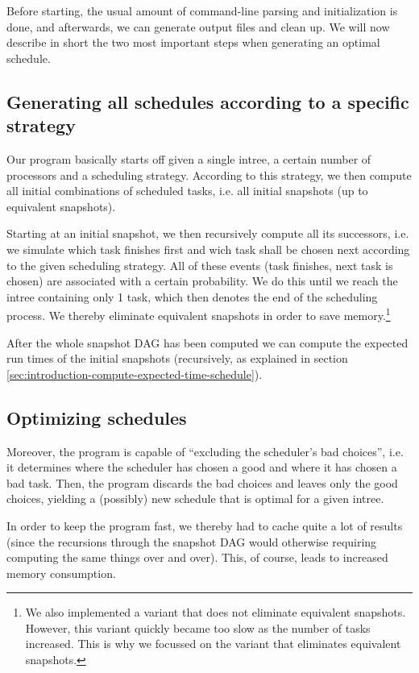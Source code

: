 Before starting, the usual amount of command-line parsing and initialization is done, and afterwards, we can generate output files and clean up. We will now describe in short the two most important steps when generating an optimal schedule.

\subsection{Generating all schedules according to a specific strategy}
\label{sec:implementation-core-generate-schedules}

Our program basically starts off given a single intree, a certain number of processors and a scheduling strategy. According to this strategy, we then compute all initial combinations of scheduled tasks, i.e. all initial snapshots (up to equivalent snapshots).

Starting at an initial snapshot, we then recursively compute all its successors, i.e. we simulate which task finishes first and wich task shall be chosen next according to the given scheduling strategy. All of these events (task finishes, next task is chosen) are associated with a certain probability. We do this until we reach the intree containing only 1 task, which then denotes the end of the scheduling process. We thereby eliminate equivalent snapshots in order to save memory.\footnote{We also implemented a variant that does not eliminate equivalent snapshots. However, this variant quickly became too slow as the number of tasks increased. This is why we focussed on the variant that eliminates equivalent snapshots.}

After the whole snapshot DAG has been computed we can compute the expected run times of the initial snapshots (recursively, as explained in section \ref{sec:introduction-compute-expected-time-schedule}).

\subsection{Optimizing schedules}
\label{sec:implementation-core-optimizing-schedules}

Moreover, the program is capable of ``excluding the scheduler's bad choices'', i.e. it determines where the scheduler has chosen a good and where it has chosen a bad task. Then, the program discards the bad choices and leaves only the good choices, yielding a (possibly) new schedule that is optimal for a given intree.

In order to keep the program fast, we thereby had to cache quite a lot of results (since the recursions through the snapshot DAG would otherwise requiring computing the same things over and over). This, of course, leads to increased memory consumption.

